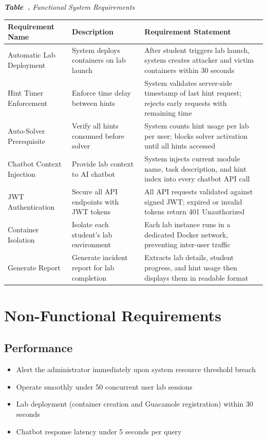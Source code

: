 \documentclass[12pt,a4paper]{report}
\newcommand{\hrow}{}
\newcommand{\hcell}[1]{\textbf{#1}}
\newcommand{\altrow}{}
\begin{document}
\begin{table}[htbp]
\centering
{}\label{tab:sys-req}
{\small\itshape\textbf{Table~\thetable.} Functional System Requirements\par}
\vspace{4pt}
\small
\begin{tabularx}{\linewidth}{|L{3.2cm}|L{3.8cm}|X|}
\hline
\hrow \hcell{Requirement Name} & \hcell{Description} & \hcell{Requirement Statement} \\ \hline
Automatic Lab Deployment & System deploys containers on lab launch & After student triggers lab launch, system creates attacker and victim containers within 30 seconds \\ \hline
\altrow Hint Timer Enforcement & Enforce time delay between hints & System validates server-side timestamp of last hint request; rejects early requests with remaining time \\ \hline
Auto-Solver Prerequisite & Verify all hints consumed before solver & System counts hint usage per lab per user; blocks solver activation until all hints accessed \\ \hline
\altrow Chatbot Context Injection & Provide lab context to AI chatbot & System injects current module name, task description, and hint index into every chatbot API call \\ \hline
JWT Authentication & Secure all API endpoints with JWT tokens & All API requests validated against signed JWT; expired or invalid tokens return 401 Unauthorized \\ \hline
\altrow Container Isolation & Isolate each student's lab environment & Each lab instance runs in a dedicated Docker network, preventing inter-user traffic \\ \hline
Generate Report & Generate incident report for lab completion & Extracts lab details, student progress, and hint usage then displays them in readable format \\ \hline
\end{tabularx}
\normalsize
\end{table}

\section{Non-Functional Requirements}

\subsection{Performance}
\begin{itemize}
  \item Alert the administrator immediately upon system resource threshold breach
  \item Operate smoothly under 50 concurrent user lab sessions
  \item Lab deployment (container creation and Guacamole registration) within 30 seconds
  \item Chatbot response latency under 5 seconds per query
\end{itemize}
\end{document}
